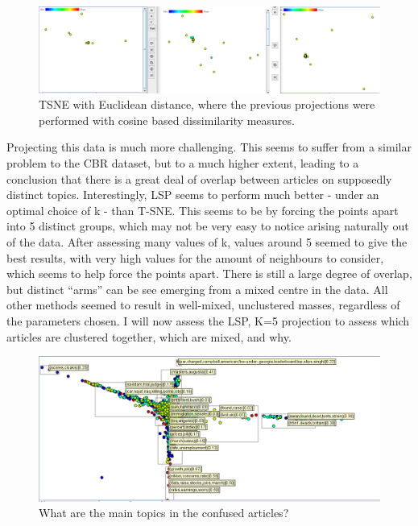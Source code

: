 \documentclass[ 10pt ]{fphw}
\begin{document}
\begin{center}
\begin{figure}[H]
    \centering
	\includegraphics[width=0.65\columnwidth]{task2c/reutersTSNE-EUC-5,100,500.PNG}
	\caption{TSNE with Euclidean distance, where the previous projections were performed with cosine based dissimilarity measures.}
	\label{fig:reuttsneeuc}
	\end{figure}
\end{center}

Projecting this data is much more challenging. This seems to suffer from a similar problem to the CBR dataset, but to a much higher extent, leading to a conclusion that there is a great deal of overlap between articles on supposedly distinct topics. Interestingly, LSP seems to perform much better - under an optimal choice of k - than T-SNE. This seems to be by forcing the points apart into 5 distinct groups, which may not be very easy to notice arising naturally out of the data. After assessing many values of k, values around 5 seemed to give the best results, with very high values for the amount of neighbours to consider, which seems to help force the points apart. There is still a large degree of overlap, but distinct ``arms'' can be see emerging from a mixed centre in the data. All other methods seemed to result in well-mixed, unclustered masses, regardless of the parameters chosen. I will now assess the LSP, K=5 projection to assess which articles are clustered together, which are mixed, and why.

\begin{center}
\begin{figure}[H]
    \centering
	\includegraphics[width=0.65\columnwidth]{task2c/explainingReuters.PNG}
	\caption{What are the main topics in the confused articles?}
	\label{fig:explReuters}
	\end{figure}
\end{center}
\end{document}
